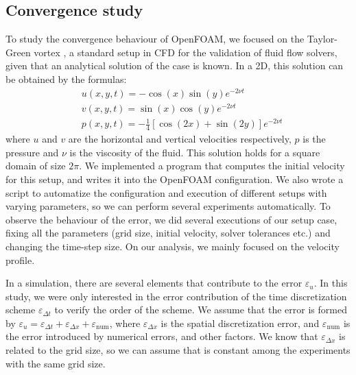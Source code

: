 \documentclass[
  english,        %
  font=times,     %
  onecolumn,      %
]{tumarticle}
\begin{document}
\subsection{Convergence study}
 
To study the convergence behaviour of OpenFOAM, we focused on the Taylor-Green vortex \cite{taylor1937mechanism, chorin1968numerical}, a standard setup in CFD for the validation of fluid flow solvers, given that an analytical solution of the case is known. In a 2D, this solution can be obtained by the formulas:
\begin{align}
    &u(x, y, t) = -\cos(x) \sin(y) e^{-2\nu t} \\
    &v(x, y, t) = \sin(x) \cos(y) e^{-2\nu t} \\
    &p(x, y, t) = -\frac{1}{4}\left[\cos(2x) + \sin(2y)\right]e^{-2\nu t}
\end{align}
where $u$ and $v$ are the horizontal and vertical velocities respectively, $p$ is the pressure and $\nu$ is the viscosity of the fluid. This solution holds for a square domain of size $2\pi$. 
We implemented a program that computes the initial velocity for this setup, and writes it into the OpenFOAM configuration. We also wrote a script to automatize the configuration and execution of different setups with varying parameters, so we can perform several experiments automatically.
To observe the behaviour of the error, we did several executions of our setup case, fixing all the parameters (grid size, initial velocity, solver tolerances etc.) and changing the time-step size. On our analysis, we mainly focused on the velocity profile.

In a simulation, there are several elements that contribute to the error $\varepsilon_{u}$. In this study, we were only interested in the error contribution of the time discretization scheme $\varepsilon_{\Delta t}$ to verify the order of the scheme. We assume that the error is formed by $\varepsilon_u = \varepsilon_{\Delta t} + \varepsilon_{\Delta x} + \varepsilon_\text{num}$, where $\varepsilon_{\Delta x}$ is the spatial discretization error, and $\varepsilon_\text{num}$ is the error introduced by numerical errors, and other factors. We know that $\varepsilon_{\Delta x}$ is related to the grid size, so we can assume that is constant among the experiments with the same grid size.
\end{document}
